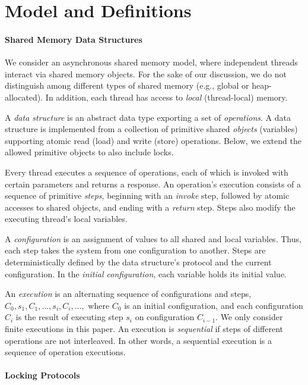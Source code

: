 \section{Model and Definitions}\label{sec:model}


\paragraph{Shared Memory Data Structures}

We consider an asynchronous shared memory model, where independent threads interact via shared memory objects.
For the sake of our discussion, we do not distinguish among different types of shared memory (e.g., global or heap-allocated).
In addition, each thread has access to \emph{local} (thread-local) memory.

A \emph{data structure} is an abstract data type exporting a set of \emph{operations}.
A data structure is implemented from a collection of primitive shared
\emph{objects} (variables) supporting atomic read (load) and write (store)
operations.
Below, we extend the allowed primitive objects to also include locks.

Every thread executes a sequence of operations, each of which is invoked with certain parameters and returns a response.
An operation's execution consists of a sequence of primitive \emph{steps}, beginning with an \emph{invoke} step, followed by
atomic accesses to shared objects, and ending with a \emph{return} step. Steps also modify the executing thread's local variables.

A \emph{configuration} is an assignment of values to all shared and local variables. Thus, each step takes the system from one
configuration to another. Steps are deterministically defined by the data structure's protocol and the current configuration.
In the \emph{initial configuration}, each variable holds its initial value.

An \emph{execution} is an alternating sequence of configurations and steps,
$C_0,s_1,C_1, \ldots,s_i,C_i,\ldots,$
where $C_0$ is an initial configuration,
and each configuration $C_i$ is the result of
executing step $s_i$ on configuration $C_{i-1}$.
We only consider finite executions in this paper.
An execution is \emph{sequential} if steps of different operations are not interleaved.
In other words, a sequential execution is a sequence of operation executions.

\paragraph{Locking Protocols}

